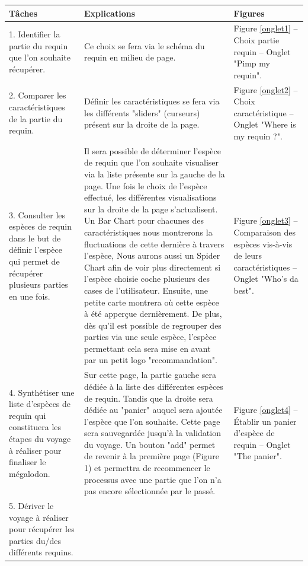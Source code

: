 \documentclass{article}
\begin{document}
\begin{center}
	\begin{tabular}{|p{3.5cm}|p{7cm}|p{3.5cm}|}
		\hline
		Tâches
		&
		Explications
		&
		Figures
		\\\hline
		1. Identifier la partie du requin que l’on souhaite récupérer.
		&
		Ce choix se fera via le schéma du requin en milieu de page.
		&
        
		Figure \ref{onglet1} – Choix partie requin – Onglet "Pimp my requin".
		\\\hline
		2. Comparer les caractéristiques de la partie du requin.
		&
		Définir les caractéristiques se fera via les différents "sliders" (curseurs) présent sur la droite de la page.
		&
		Figure \ref{onglet2} – Choix caractéristique – Onglet "Where is my requin ?".
		\\\hline
		3. Consulter les espèces de requin dans le but de définir l’espèce qui permet de récupérer plusieurs parties en une fois.
		&
		Il sera possible de déterminer l’espèce de requin que l’on souhaite visualiser via la liste présente sur la gauche de la page. Une fois le choix de l’espèce effectué, les différentes visualisations sur la droite de la page s'actualisent. Un Bar Chart pour chacunes des caractéristiques nous montrerons la fluctuations de cette dernière à travers l'espèce, Nous aurons aussi un Spider Chart afin de voir plus directement si l'espèce choisie coche plusieurs des cases de l'utilisateur. Ensuite, une petite carte montrera où cette espèce à été apperçue dernièrement. De plus, dès qu'il est possible de regrouper des parties via une seule espèce, l'espèce permettant cela sera mise en avant par un petit logo "recommandation".
		&
		Figure \ref{onglet3} – Comparaison des espèces vis-à-vis de leurs caractéristiques – Onglet "Who's da best".
		\\\hline
		4. Synthétiser une liste d’espèces de requin qui constituera les étapes du voyage à réaliser pour finaliser le mégalodon.
		&
		Sur cette page, la partie gauche sera dédiée à la liste des différentes espèces de requin. Tandis que la droite sera dédiée au "panier" auquel sera ajoutée l’espèce que l’on souhaite. Cette page sera sauvegardée jusqu’à la validation du voyage. Un bouton "add" permet de revenir à la première page (Figure 1) et permettra de recommencer le processus avec une partie que l’on n'a pas encore sélectionnée par le passé.
		&
		Figure \ref{onglet4} – Établir un panier d’espèce de requin – Onglet "The panier".
		\\\hline
		5. Dériver le voyage à réaliser pour récupérer les parties du/des différents requins.

\end{tabular}
\end{center}
\end{document}
